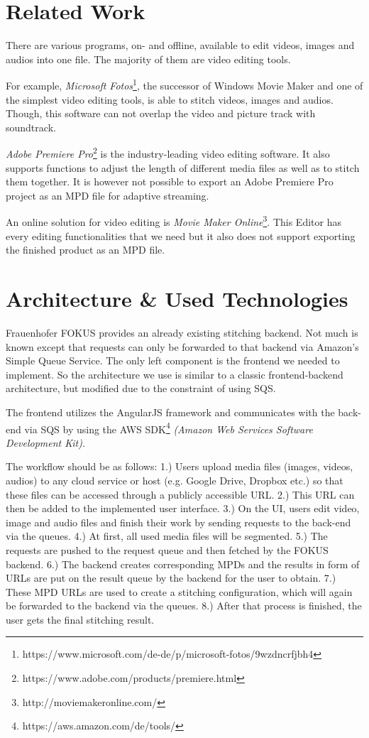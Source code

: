 \documentclass[conference]{IEEEtran}
\begin{document}
\section{Related Work}
There are various programs, on- and offline, available to edit videos, images and audios into one file.
The majority of them are video editing tools.

For example, \textit{Microsoft Fotos}\footnote{https://www.microsoft.com/de-de/p/microsoft-fotos/9wzdncrfjbh4}, the successor of Windows Movie Maker and one of the simplest video editing tools, is able to stitch videos, images and audios.
Though, this software can not overlap the video and picture track with soundtrack.

\textit{Adobe Premiere Pro}\footnote{https://www.adobe.com/products/premiere.html} is the industry-leading video editing software.
It also supports functions to adjust the length of different media files as well as to stitch them together.
It is however not possible to export an Adobe Premiere Pro project as an MPD file for adaptive streaming.

An online solution for video editing is \textit{Movie Maker Online}\footnote{http://moviemakeronline.com/}.
This Editor has every editing functionalities that we need but it also does not support exporting the finished product as an MPD file.

\section{Architecture \& Used Technologies}
Frauenhofer FOKUS provides an already existing stitching backend.
Not much is known except that requests can only be forwarded to that backend via Amazon's Simple Queue Service.
The only left component is the frontend we needed to implement.
So the architecture we use is similar to a classic frontend-backend architecture, but modified due to the constraint of using SQS.

The frontend utilizes the AngularJS framework and communicates with the back-end via SQS by using the AWS SDK\footnote{https://aws.amazon.com/de/tools/} \textit{(Amazon Web Services Software Development Kit)}.

The workflow should be as follows:
1.) Users upload media files (images, videos, audios) to any cloud service or host (e.g. Google Drive, Dropbox etc.) so that these files can be accessed through a publicly accessible URL.
2.) This URL can then be added to the implemented user interface.
3.) On the UI, users edit video, image and audio files and finish their work by sending requests to the back-end via the queues.
4.) At first, all used media files will be segmented.
5.) The requests are pushed to the request queue and then fetched by the FOKUS backend.
6.) The backend creates corresponding MPDs and the results in form of URLs are put on the result queue by the backend for the user to obtain.
7.) These MPD URLs are used to create a stitching configuration, which will again be forwarded to the backend via the queues.
8.) After that process is finished, the user gets the final stitching result.
\end{document}

